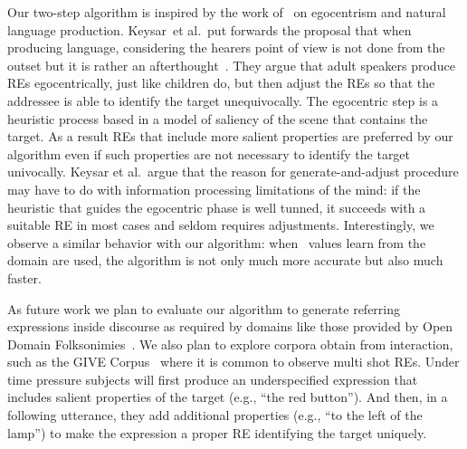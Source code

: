 Our two-step algorithm is inspired by the work of~\cite{keysar:Curr98} on egocentrism and natural language production. Keysar~et al.\ put forwards the proposal that when producing language, considering the hearers point of view is not done from the outset but it is rather an afterthought~\cite{keysar:Curr98}. They argue that adult speakers produce REs egocentrically, just like children do, but then adjust the REs so that the addressee is able to identify the target unequivocally. The egocentric step is a heuristic process based in a model of saliency of the scene that contains the target. As a result REs that include more salient properties are preferred by our algorithm even if such properties are not necessary to identify the target univocally. Keysar et al.~argue that the reason for generate-and-adjust procedure may have to do with information processing limitations of the mind: if the heuristic that guides the egocentric phase is well tunned, it succeeds with a suitable RE in most cases and seldom requires adjustments. Interestingly, we observe a similar behavior with our algorithm: when \puse\ values learn from the domain are used, the algorithm is not only much more accurate but also much faster. 

As future work we plan to evaluate our algorithm to generate referring expressions inside discourse as required by domains like those provided by Open Domain Folksonimies~\cite{pacheco-duboue-dominguez:2012:NAACL-HLT}. We also plan to explore corpora obtain from interaction, such as the GIVE Corpus~\cite{GarGarKolStr10} where it is common to observe multi shot REs. Under time pressure subjects will first produce an underspecified expression that includes salient properties of the target (e.g., ``the red button'').  And then, in a following utterance, they add additional properties (e.g., ``to the left of the lamp'') to make the expression a proper RE  identifying the target uniquely.

